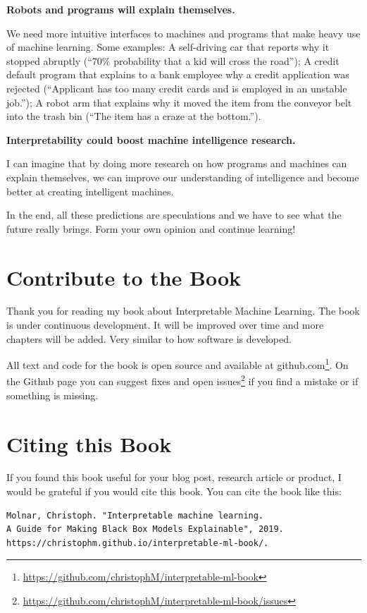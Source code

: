 \documentclass[
  11pt,
]{scrbook}
\renewcommand{\href}[2]{#2\footnote{\url{#1}}}
\begin{document}
\textbf{Robots and programs will explain themselves.}

We need more intuitive interfaces to machines and programs that make heavy use of machine learning.
Some examples:
A self-driving car that reports why it stopped abruptly (``70\% probability that a kid will cross the road'');
A credit default program that explains to a bank employee why a credit application was rejected (``Applicant has too many credit cards and is employed in an unstable job.'');
A robot arm that explains why it moved the item from the conveyor belt into the trash bin (``The item has a craze at the bottom.'').

\textbf{Interpretability could boost machine intelligence research.}

I can imagine that by doing more research on how programs and machines can explain themselves, we can improve our understanding of intelligence and become better at creating intelligent machines.

In the end, all these predictions are speculations and we have to see what the future really brings.
Form your own opinion and continue learning!

\hypertarget{contribute}{%
\chapter{Contribute to the Book}\label{contribute}}

Thank you for reading my book about Interpretable Machine Learning.
The book is under continuous development.
It will be improved over time and more chapters will be added.
Very similar to how software is developed.

All text and code for the book is open source and \href{https://github.com/christophM/interpretable-ml-book}{available at github.com}.
On the Github page you can suggest fixes and \href{https://github.com/christophM/interpretable-ml-book/issues}{open issues} if you find a mistake or if something is missing.

\hypertarget{cite}{%
\chapter{Citing this Book}\label{cite}}

If you found this book useful for your blog post, research article or product, I would be grateful if you would cite this book.
You can cite the book like this:

\begin{verbatim}
Molnar, Christoph. "Interpretable machine learning.
A Guide for Making Black Box Models Explainable", 2019.
https://christophm.github.io/interpretable-ml-book/.
\end{verbatim}
\end{document}
